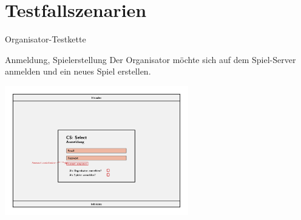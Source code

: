 \documentclass[xcolor=dvipsnames]{beamer}
\begin{document}
\section{Testfallszenarien}
    \begin{frame}{Organisator-Testkette}
        \begin{block} {Anmeldung, Spielerstellung}
            Der Organisator möchte sich auf dem Spiel-Server anmelden und ein neues Spiel erstellen.
        \end{block}
        \centering
        \includegraphics[width=8cm]{img/Anmeldung.jpg}
    \end{frame}
\end{document}

